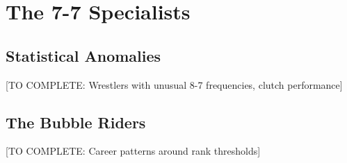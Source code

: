 \section{The 7-7 Specialists}

\subsection{Statistical Anomalies}

[TO COMPLETE: Wrestlers with unusual 8-7 frequencies, clutch performance]

\subsection{The Bubble Riders}

[TO COMPLETE: Career patterns around rank thresholds]